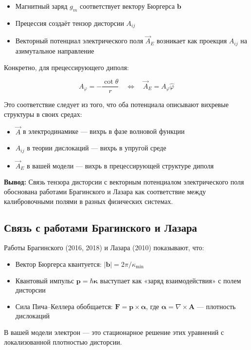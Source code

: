 \documentclass[12pt]{article}
\begin{document}
\begin{itemize}
\item Магнитный заряд $g_m$ соответствует вектору Бюргерса $\boldsymbol{b}$
\item Прецессия создаёт тензор дисторсии $A_{ij}$
\item Векторный потенциал электрического поля $\vec{A}_E$ возникает как проекция $A_{ij}$ на азимутальное направление
\end{itemize}

Конкретно, для прецессирующего диполя:

\[
A_{\varphi} = -\frac{\cot\theta}{r} \quad \Leftrightarrow \quad \vec{A}_E = A_{\varphi} \hat{\varphi}
\]

Это соответствие следует из того, что оба потенциала описывают вихревые структуры в своих средах:
\begin{itemize}
\item $\vec{A}$ в электродинамике — вихрь в фазе волновой функции
\item $A_{ij}$ в теории дислокаций — вихрь в упругой среде
\item $\vec{A}_E$ в вашей модели — вихрь в прецессирующей структуре диполя
\end{itemize}

\textbf{Вывод:} Связь тензора дисторсии с векторным потенциалом электрического поля обоснована работами Брагинского и Лазара как соответствие между калибровочными полями в разных физических системах.

\subsection{Связь с работами Брагинского и Лазара}

Работы Брагинского (2016, 2018) и Лазара (2010) показывают, что:

\begin{itemize}
\item Вектор Бюргерса квантуется: $|\boldsymbol{b}| = 2\pi / \kappa_{\min}$
\item Квантовый импульс $\boldsymbol{p} = \hbar \boldsymbol{\kappa}$ выступает как «заряд взаимодействия» с полем дисторсии
\item Сила Пича–Келлера обобщается: $\boldsymbol{F} = \boldsymbol{p} \times \boldsymbol{\alpha}$, где $\boldsymbol{\alpha} = \nabla \times \boldsymbol{A}$ — плотность дислокаций
\end{itemize}

В вашей модели электрон — это стационарное решение этих уравнений с локализованной плотностью дисторсии.
\end{document}
